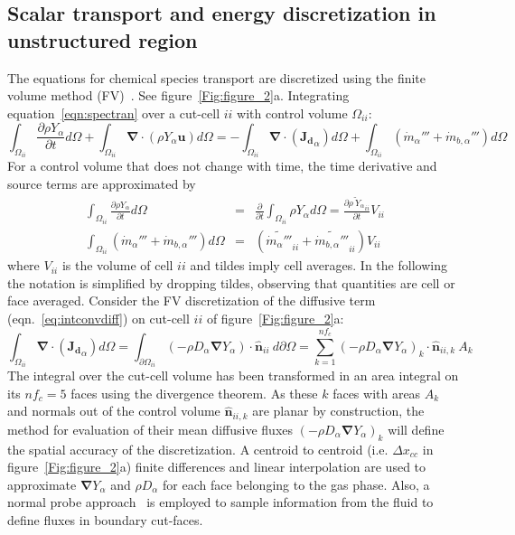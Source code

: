 \documentclass[journal,article,atmosphere,submit,moreauthors,pdftex]{Definitions/mdpi}
\begin{document}
\subsection{Scalar transport and energy discretization in unstructured region}

The equations for chemical species transport are discretized using the finite volume method (FV)~\cite{eymard_2000,leveque_2002}. See figure~\ref{Fig:figure_2}a. Integrating equation~\eqref{eqn:spectran} over a cut-cell $ii$ with control volume $\Omega_{ii}$:
%
\begin{equation}
 \int_{\Omega_{ii}} {\frac{\partial \rho Y_\alpha}{\partial t}} d \Omega + \int_{\Omega_{ii}} { \boldsymbol{\nabla} \cdot  \left(  \rho Y_\alpha \mathbf{u} \right)
      } d \Omega  = -\int_{\Omega_{ii}} { \boldsymbol{\nabla} \cdot \left(  \mathbf{J_{d}}_\alpha  \right)  } d \Omega + \int_{\Omega_{ii}} {( \dot{m}_\alpha'''+\dot{m}_{b,\alpha}''') } d \Omega \label{eq:intconvdiff}
\end{equation}
%
For a control volume that does not change with time, the time derivative and source terms are approximated by
%
\begin{eqnarray}
  \int_{\Omega_{ii}} {\frac{\partial \rho Y_\alpha}{\partial t}} d \Omega & = & \frac{\partial}{\partial t} \int_{\Omega_{ii}} {\rho Y_\alpha} d \Omega
  = \frac{\partial \widetilde{\rho \: Y_\alpha }_{ii}}{\partial t} V_{ii} \\
  \int_{\Omega_{ii}} {( \dot{m}_\alpha''' +\dot{m}_{b,\alpha}''')} d \Omega & = & (\widetilde{ \dot{m}_\alpha''' }_{ii}+ \widetilde{\dot{m}_{b,\alpha}'''}_{ii}) V_{ii} \label{eq:intcons}
\end{eqnarray}
%
where $V_{ii}$ is the volume of cell $ii$ and tildes imply cell averages. In the following the notation is simplified by dropping tildes, observing that quantities are cell or face averaged. Consider the FV discretization of the diffusive term (eqn.~\eqref{eq:intconvdiff}) on cut-cell $ii$ of figure~\ref{Fig:figure_2}a:
%
\begin{equation}
\int_{\Omega_{ii}} { \boldsymbol{\nabla} \cdot \left(  \mathbf{J_{d}}_\alpha  \right)  } d \Omega =
    \int_{\partial \Omega_{ii}} { \left( - \rho D_\alpha \boldsymbol{\nabla} Y_\alpha \right) \cdot \hat{\mathbf{n}}_{ii} } \: d \partial \Omega = \sum^{nf_c}_{k=1}
    \left( - \rho D_\alpha \boldsymbol{\nabla} Y_\alpha \right)_k \cdot \hat{\mathbf{n}}_{ii,k} \: A_k \label{eq:discfvdiffcc}
\end{equation}
%
The integral over the cut-cell volume has been transformed in an area integral on its $nf_c=5$ faces using the divergence theorem. As these $k$ faces with areas $A_k$ and normals out of the control volume $\hat{\mathbf{n}}_{ii,k}$ are planar by construction, the method for evaluation of their mean diffusive fluxes $\left( - \rho D_\alpha \boldsymbol{\nabla} Y_\alpha \right)_k$ will define the spatial accuracy of the discretization. A centroid to centroid (i.e. $\Delta x_{cc}$ in figure~\ref{Fig:figure_2}a) finite differences and linear interpolation are used to approximate $\boldsymbol{\nabla} Y_\alpha$ and $\rho D_\alpha$ for each face belonging to the gas phase. Also, a normal probe approach~\cite{balaras_2004} is employed to sample information from the fluid to define fluxes in boundary cut-faces. 
\end{document}
